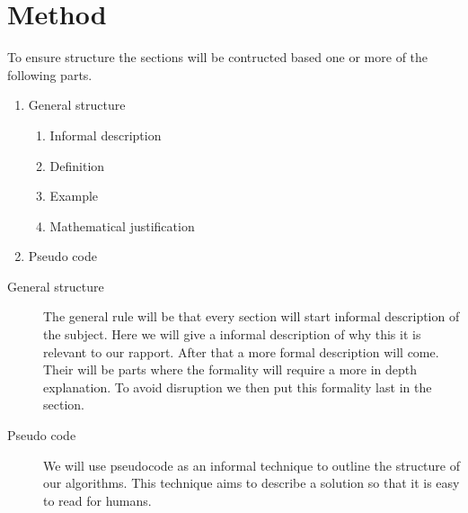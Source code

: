 \section{Method}
To ensure structure the sections will be contructed based one or more of the following parts.
\begin{enumerate}
    \item General structure 
    \begin{enumerate}
        \item Informal description
        \item Definition
        \item Example
        \item Mathematical justification    
   
    \end{enumerate}
  
    \item Pseudo code
\end{enumerate}

\begin{description}
    \item[General structure] The general rule will be that every section will start informal description of the subject. Here we will give a informal description of why this it is relevant to our rapport. After that a more formal description will come. Their will be parts where the formality will require a more in depth explanation. To avoid disruption we then put this formality last in the section. 
    
    
    \item[Pseudo code]  We will use pseudocode as an informal technique to outline the structure of our algorithms. This technique aims to describe a solution so that it is easy to read for humans.

\end{description}

